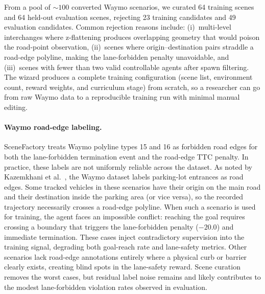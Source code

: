 From a pool of ${\sim}100$ converted Waymo scenarios, we curated 64 training scenes and 64 held-out evaluation scenes, rejecting 23 training candidates and 49 evaluation candidates.
Common rejection reasons include: (i)~multi-level interchanges where z-flattening produces overlapping geometry that would poison the road-point observation, (ii)~scenes where origin--destination pairs straddle a road-edge polyline, making the lane-forbidden penalty unavoidable, and (iii)~scenes with fewer than two valid controllable agents after spawn filtering.
The wizard produces a complete training configuration (scene list, environment count, reward weights, and curriculum stage) from scratch, so a researcher can go from raw Waymo data to a reproducible training run with minimal manual editing.

\paragraph{Waymo road-edge labeling.}
SceneFactory treats Waymo polyline types 15 and 16 as forbidden road edges for both the lane-forbidden termination event and the road-edge TTC penalty.
In practice, these labels are not uniformly reliable across the dataset.
As noted by Kazemkhani et al.~\cite{kazemkhani_gpudrive_2025}, the Waymo dataset labels parking-lot entrances as road edges.
Some tracked vehicles in these scenarios have their origin on the main road and their destination inside the parking area (or vice versa), so the recorded trajectory necessarily crosses a road-edge polyline.
When such a scenario is used for training, the agent faces an impossible conflict: reaching the goal requires crossing a boundary that triggers the lane-forbidden penalty ($-20.0$) and immediate termination.
These cases inject contradictory supervision into the training signal, degrading both goal-reach rate and lane-safety metrics.
Other scenarios lack road-edge annotations entirely where a physical curb or barrier clearly exists, creating blind spots in the lane-safety reward.
Scene curation removes the worst cases, but residual label noise remains and likely contributes to the modest lane-forbidden violation rates observed in evaluation.

